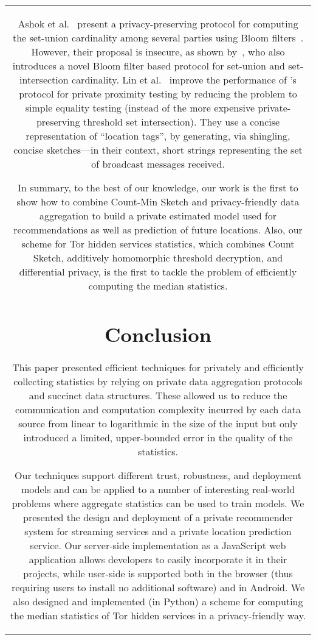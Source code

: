 \documentclass[conference]{IEEEtran}
\begin{document}
\begin{figure*}[ht!]
{\begin{tabular}{|c|}
Ashok et al.~\cite{ashok2014scalable} present a privacy-preserving protocol for computing the set-union cardinality among several parties using Bloom filters~\cite{bloom1970space}. However, their proposal is insecure, as shown by~\cite{egertprivately}, who also introduces a novel Bloom filter based protocol for set-union and set-intersection cardinality. 
Lin et al.~\cite{lin2012efficient} improve the performance of \cite{narayanan2011location}'s protocol for private proximity testing by reducing the problem to simple equality testing (instead of the more expensive private-preserving threshold set intersection). They use a concise representation of ``location tags'', by generating, via shingling, concise sketches---in their context, short strings representing the set of broadcast messages received. 

In summary, to the best of our knowledge, our work is the first to show how to combine Count-Min Sketch and privacy-friendly data aggregation to build a private estimated model used for recommendations as well as prediction of future locations. Also, our scheme for Tor hidden services statistics, which combines Count Sketch, additively homomorphic threshold decryption, and differential privacy, is the first to tackle the problem of efficiently computing the median statistics.

\section{Conclusion}\label{sec:conclusion}
This paper presented efficient techniques for privately and efficiently collecting statistics by relying on private data aggregation protocols and succinct data structures.
These allowed us to reduce the communication and computation complexity incurred by each data source from linear to logarithmic in the size of the input but only introduced a limited, upper-bounded error in the quality of the statistics.

Our techniques support different trust, robustness, and deployment models and can be applied to a number of interesting real-world problems where aggregate statistics can be used to train models. We presented the design and deployment of a private recommender system for streaming services and a private location prediction service. Our server-side implementation as a JavaScript web application allows developers to easily incorporate it in their projects, while user-side is supported both in the browser (thus requiring users to install no additional software) and in Android.
We also designed and implemented (in Python) a scheme for computing the median statistics of Tor hidden services in a privacy-friendly way.




\end{tabular}}
\end{figure*}
\end{document}
